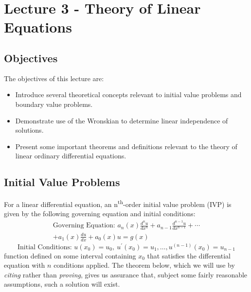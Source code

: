 \chapter{Lecture 3 - Theory of Linear Equations}
\label{ch:lec3}
\section{Objectives}
The objectives of this lecture are:
\begin{itemize}
\item Introduce several theoretical concepts relevant to initial value problems and boundary value problems.
\item Demonstrate use of the Wronskian to determine linear independence of solutions.
\item Present some important theorems and definitions relevant to the theory of linear ordinary differential equations.
\end{itemize}

\section{Initial Value Problems} 

For a linear differential equation, an n\textsuperscript{th}-order initial value problem (IVP) is given by the following governing equation and initial conditions:
\begin{multline}
\text{Governing Equation: }a_n(x)\frac{d^n u}{dx^n}+a_{n-1}\frac{d^{n-1}u}{dx^{n-1}}+\cdots \\+a_1(x)\frac{du}{dx}+a_0(x)u=g(x)
\label{eq:ivp-ge}
\end{multline}
\begin{equation}
\text{Initial Conditions: }u(x_0)=u_0, \ u^{\prime}(x_0)=u_1,\dots,u^{(n-1)}(x_0)=u_{n-1}
\label{eq:ivp-ics}
\end{equation}
\noindent {} function defined on some interval containing $x_0$ that satisfies the differential equation with $n$ conditions applied. The theorem below, which we will use by \emph{citing} rather than \emph{proving}, gives us assurance that, subject some fairly reasonable assumptions, such a solution will exist.  

